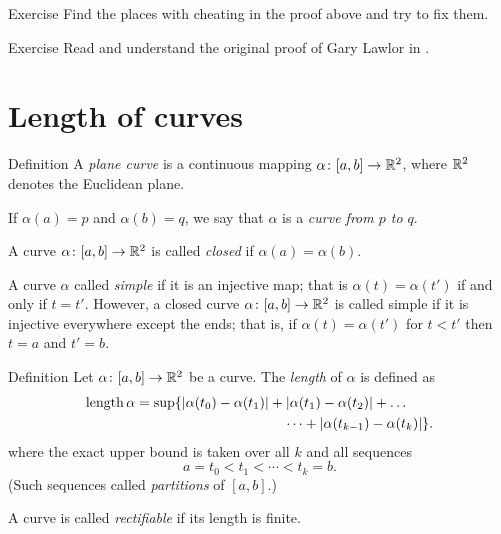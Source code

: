 \begin{thm}{Exercise}
Find the places with cheating in the proof above and try to fix them.
\end{thm}

\begin{thm}{Exercise} Read and understand the original proof of Gary Lawlor in \cite{lawlor}.
\end{thm}



\chapter{Length of curves}

\begin{thm}{Definition}\label{def:curve}
A \emph{plane curve} is a continuous mapping $\alpha\:[a,b]\z\to \RR^2$,
where $\mathbb{R}^2$ denotes the Euclidean plane. 

If $\alpha(a)=p$ and $\alpha(b)=q$,
we say that $\alpha$ is a \emph{curve from $p$ to $q$}.

A curve $\alpha\colon[a,b]\to \mathbb{R}^2$ is called \emph{closed} if $\alpha(a)=\alpha(b)$.

A curve $\alpha$ called \emph{simple} if it is an injective map;
that is $\alpha(t)=\alpha(t')$ if and only if $t=t'$.
However, a closed curve $\alpha\colon[a,b]\to \mathbb{R}^2$ is called simple if it is injective 
everywhere except the ends; that is, if
$\alpha(t)=\alpha(t')$ for $t<t'$ then $t=a$ and $t'=b$.
\end{thm}
 


\begin{thm}{Definition}\label{def:length}
Let $\alpha\colon[a,b]\to \mathbb{R}^2$ be a curve.
The \emph{length} of $\alpha$ is defined as
\begin{align*}
\length \alpha
&= 
\sup \{|\alpha(t_0)-\alpha(t_1)|+|\alpha(t_1)-\alpha(t_2)|+\dots
\\
&\ \ \ \ \ \ \ \ \ \ \ \ \ \ \ \ \ \ \ \ \ \ \ \ \ \ \ \ \ \ \ \ \dots+|\alpha(t_{k-1})-\alpha(t_k)|\}. 
\end{align*}
where the exact upper bound is taken over all $k$ and all sequences
\[a=t_0 < t_1 < \cdots < t_k=b.\]
(Such sequences called \emph{partitions} of $[a,b]$.)

A curve is called \emph{rectifiable} if its length is finite.
\end{thm}

